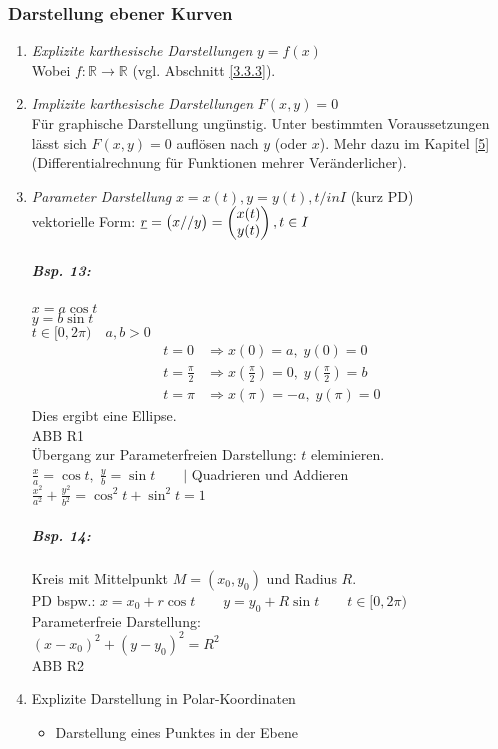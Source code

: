 \subsubsection{Darstellung ebener Kurven}
\begin{enumerate}
\item \emph{Explizite karthesische Darstellungen} $y=f(x)$\\
Wobei $f: \mathbb{R}\to \mathbb{R}$ (vgl. Abschnitt \ref{3.3.3}).
\item \emph{Implizite karthesische Darstellungen} $F(x,y)=0$\\
Für graphische Darstellung ungünstig. Unter bestimmten Voraussetzungen lässt sich $F(x,y)=0$ auflösen nach $y$ (oder $x$). Mehr dazu im Kapitel \ref{5} (Differentialrechnung für Funktionen mehrer Veränderlicher).
\item \emph{Parameter Darstellung} $x=x(t), y=y(t), t/in I$ (kurz PD)\\
vektorielle Form: $\underline{r}=\begin{pmatrix}x//y\end{pmatrix}=\begin{pmatrix}x(t)\\y(t)\end{pmatrix}, t \in I$
\subparagraph{Bsp. 13:}\parskp
$x=a \cos t$\\
$y=b \sin t$\\
$t\in [0,2\pi) \quad a,b>0$
\begin{align*}
t=0 &\Rightarrow x(0)=a, \; y(0)=0\\
t=\frac{\pi}{2} &\Rightarrow x\left(\frac{\pi}{2}\right)=0, \; y\left(\frac{\pi}{2}\right)=b\\
t=\pi &\Rightarrow x\left(\pi\right)=-a,\; y(\pi)=0
\end{align*}
Dies ergibt eine Ellipse.\\
ABB R1\\
Übergang zur Parameterfreien Darstellung: $t$ eleminieren.\\
$\frac{x}{a}=\cos t, \; \frac{y}{b}=\sin t \qquad|$ Quadrieren und Addieren\\
$\boxed{\frac{x^2}{a^2}+\frac{y^2}{b^2}=\cos^2t+\sin^2t=1}$
\subparagraph{Bsp. 14:} Kreis mit Mittelpunkt $M=(x_0, y_0) $ und Radius $R$.\\
PD bspw.: $x=x_0+r\cos t \qquad y=y_0+R \sin t \qquad t \in [0,2\pi)$\\
Parameterfreie Darstellung: \\
$(x-x_0)^2+(y-y_0)^2=R^2$\\
ABB R2
\item Explizite Darstellung in Polar-Koordinaten
\begin{itemize}
\item Darstellung eines Punktes in der Ebene\\

\end{itemize}
\end{enumerate}
